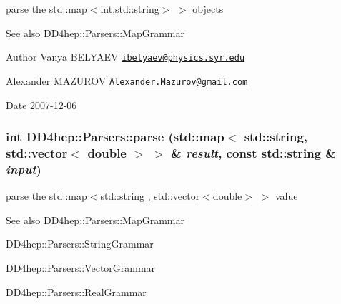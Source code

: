 parse the {\ttfamily std::map$<$int,\hyperlink{classstd_1_1string}{std::string}$>$ $>$} objects \begin{DoxySeeAlso}{See also}
DD4hep::Parsers::MapGrammar 
\end{DoxySeeAlso}
\begin{DoxyAuthor}{Author}
Vanya BELYAEV \href{mailto:ibelyaev@physics.syr.edu}{\tt ibelyaev@physics.syr.edu} 

Alexander MAZUROV \href{mailto:Alexander.Mazurov@gmail.com}{\tt Alexander.Mazurov@gmail.com} 
\end{DoxyAuthor}
\begin{DoxyDate}{Date}
2007-\/12-\/06 
\end{DoxyDate}
\hypertarget{namespace_d_d4hep_1_1_parsers_a117aacde08a7caa18db156f5871ad9cf}{
\subsubsection[{parse}]{\setlength{\rightskip}{0pt plus 5cm}int DD4hep::Parsers::parse (std::map$<$ std::string, std::vector$<$ double $>$ $>$ \& {\em result}, \/  const std::string \& {\em input})}}
\label{namespace_d_d4hep_1_1_parsers_a117aacde08a7caa18db156f5871ad9cf}


parse the {\ttfamily std::map$<$\hyperlink{classstd_1_1string}{std::string} , \hyperlink{classstd_1_1vector}{std::vector}$<$double$>$ $>$} value \begin{DoxySeeAlso}{See also}
DD4hep::Parsers::MapGrammar 

DD4hep::Parsers::StringGrammar 

DD4hep::Parsers::VectorGrammar 

DD4hep::Parsers::RealGrammar 
\end{DoxySeeAlso}

